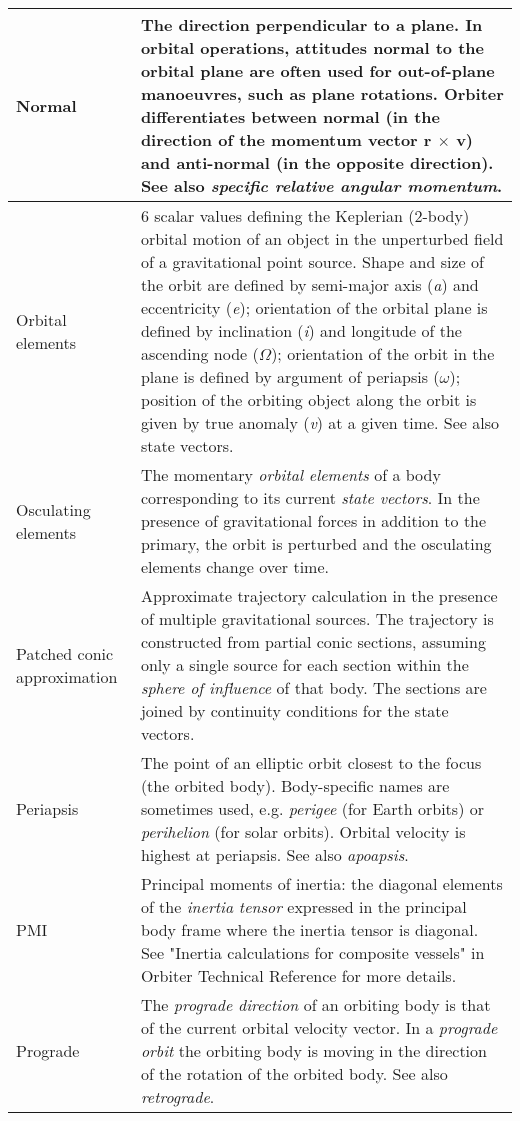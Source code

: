 \documentclass[Orbiter User Manual.tex]{subfiles}
\begin{document}
\begin{longtable}{ |p{}|p{}| }
	\hline\rule{0pt}{2ex}
	Normal & The direction perpendicular to a plane. In orbital operations, attitudes normal to the orbital plane are often used for out-of-plane manoeuvres, such as plane rotations. Orbiter differentiates between normal (in the direction of the momentum vector \textbf{r} $\times$ \textbf{v}) and anti-normal (in the opposite direction). See also \textit{specific relative angular momentum}.\\
	\hline\rule{0pt}{2ex}
	Orbital elements & 6 scalar values defining the Keplerian (2-body) orbital motion of an object in the unperturbed field of a gravitational point source. Shape and size of the orbit are defined by semi-major axis (\textit{a}) and eccentricity (\textit{e}); orientation of the orbital plane is defined by inclination (\textit{i}) and longitude of the ascending node ($\Omega$); orientation of the orbit in the plane is defined by argument of periapsis ($\omega$); position of the orbiting object along the orbit is given by true anomaly (\textit{v}) at a given time. See also state vectors.\\
	\hline\rule{0pt}{2ex}
	Osculating elements & The momentary \textit{orbital elements} of a body corresponding to its current \textit{state vectors}. In the presence of gravitational forces in addition to the primary, the orbit is perturbed and the osculating elements change over time.\\
	\hline\rule{0pt}{2ex}
	Patched conic approximation & Approximate trajectory calculation in the presence of multiple gravitational sources. The trajectory is constructed from partial conic sections, assuming only a single source for each section within the \textit{sphere of influence} of that body. The sections are joined by continuity conditions for the state vectors.\\
	\hline\rule{0pt}{2ex}
	Periapsis & The point of an elliptic orbit closest to the focus (the orbited body). Body-specific names are sometimes used, e.g. \textit{perigee} (for Earth orbits) or \textit{perihelion} (for solar orbits). Orbital velocity is highest at periapsis. See also \textit{apoapsis}.\\
	\hline\rule{0pt}{2ex}
	PMI & Principal moments of inertia: the diagonal elements of the \textit{inertia tensor} expressed in the principal body frame where the inertia tensor is diagonal. See "Inertia calculations for composite vessels" in Orbiter Technical Reference for more details.\\
	\hline\rule{0pt}{2ex}
	Prograde & The \textit{prograde direction} of an orbiting body is that of the current orbital velocity vector. In a \textit{prograde orbit} the orbiting body is moving in the direction of the rotation of the orbited body. See also \textit{retrograde}.\\

\end{longtable}
\end{document}
